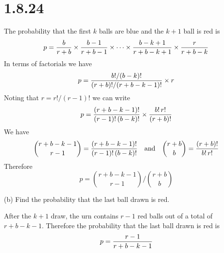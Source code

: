 \section*{1.8.24}
The probability that the first $k$ balls are blue and the $k+1$ ball is red is
$$p={b\over r+b}\times{b-1\over r+b-1}\times\cdots\times
{b-k+1\over r+b-k+1}\times{r\over r+b-k}$$
In terms of factorials we have
$$p={b!/(b-k)!\over(r+b)!/(r+b-k-1)!}\times r$$
Noting that $r=r!/(r-1)!$ we can write
$$p={(r+b-k-1)!\over(r-1)!\,(b-k)!}\times{b!\,r!\over(r+b)!}$$
We have
$$
{r+b-k-1\choose r-1}={(r+b-k-1)!\over (r-1)!\,(b-k)!}
\quad
\hbox{and}
\quad
{r+b\choose b}={(r+b)!\over b!\,r!}
$$
Therefore
$$p={r+b-k-1\choose r-1}\bigg/{r+b\choose b}$$

\bigskip
\noindent
(b) Find the probability that the last ball drawn is red.

\bigskip
\noindent
After the $k+1$ draw, the urn contains $r-1$ red balls out of
a total of $r+b-k-1$.
Therefore the probability that the last ball drawn is red is
$$p={r-1\over r+b-k-1}$$
